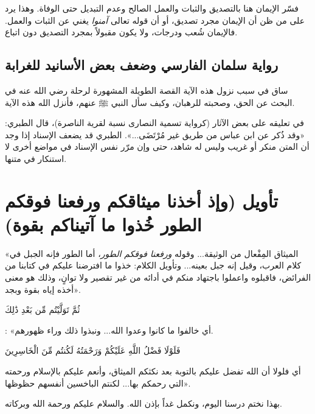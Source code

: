 \begin{fawaid}
فسّر  الإيمان هنا بالتصديق والثبات والعمل الصالح وعدم التبديل حتى الوفاة. وهذا يرد على من ظن أن الإيمان مجرد تصديق، أو أن قوله تعالى \textit{آمنوا} يغني عن الثبات والعمل. فالإيمان شُعب ودرجات، ولا يكون مقبولاً بمجرد التصديق دون اتباع.
\end{fawaid}

\subsection{رواية سلمان الفارسي وضعف بعض الأسانيد للغرابة}
ساق  في سبب نزول هذه الآية القصة الطويلة المشهورة لرحلة  رضي الله عنه في البحث عن الحق، وصحبته للرهبان، وكيف سأل النبي ﷺ عنهم، فأنزل الله هذه الآية.

\begin{fawaid}
في تعليقه على بعض الآثار (كرواية تسمية النصارى نسبة لقرية الناصرة)، قال الطبري: «وقد ذُكر عن ابن عباس من طريق غير مُرْتَضَى...». الطبري قد يضعف الإسناد إذا وجد أن المتن منكر أو غريب وليس له شاهد، حتى وإن مرّر نفس الإسناد في مواضع أخرى لا استنكار في متنها.
\end{fawaid}

\separator

\section{تأويل (وإذ أخذنا ميثاقكم ورفعنا فوقكم الطور خُذوا ما آتيناكم بقوة)}
 «الميثاق المِفْعال من الوثيقة... وقوله \textit{ورفعنا فوقكم الطور}، أما الطور فإنه الجبل في كلام العرب، وقيل إنه جبل بعينه... وتأويل الكلام: خذوا ما افترضنا عليكم في كتابنا من الفرائض، فاقبلوه واعملوا باجتهاد منكم في أدائه من غير تقصير ولا توانٍ، وذلك هو معنى أخذه إياه بقوة وبجد».

 \begin{ayah}ثُمَّ تَوَلَّيْتُم مِّن بَعْدِ ذَٰلِكَ\end{ayah}: «أي خالفوا ما كانوا وعدوا الله... ونبذوا ذلك وراء ظهورهم. \begin{ayah}فَلَوْلَا فَضْلُ اللَّهِ عَلَيْكُمْ وَرَحْمَتُهُ لَكُنتُم مِّنَ الْخَاسِرِينَ\end{ayah} أي فلولا أن الله تفضل عليكم بالتوبة بعد نكثكم الميثاق، وأنعم عليكم بالإسلام ورحمته التي رحمكم بها... لكنتم الباخسين أنفسهم حظوظها».

بهذا نختم درسنا اليوم، ونكمل غداً بإذن الله. والسلام عليكم ورحمة الله وبركاته.
